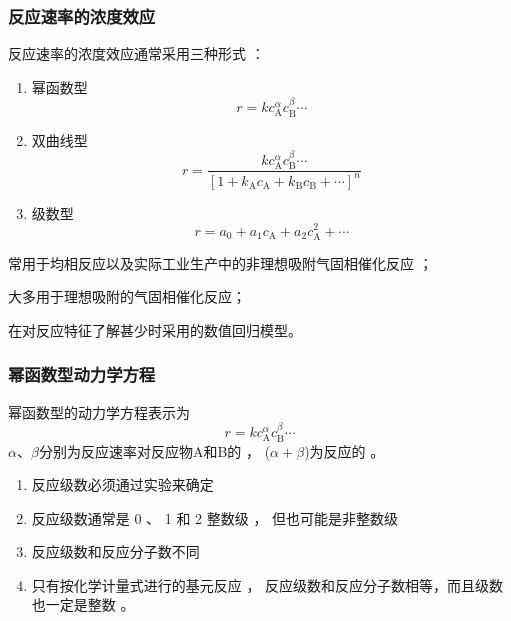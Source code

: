 \begin{frame}
    \frametitle{反应速率的浓度效应}
    \begin{minipage}{0.48\linewidth}
        反应速率的浓度效应通常采用三种形式 ：
        \begin{enumerate}
            \item 幂函数型
              \[
                  r=kc_\mathrm{A}^{\alpha}c_\mathrm{B}^{\beta}\cdots
              \]
            \item 双曲线型
              \[
                  r=\frac{kc_\mathrm{A}^{\alpha}c_\mathrm{B}^{\beta}\cdots}{[1+k_\mathrm{A}c_\mathrm{A}+k_\mathrm{B}c_\mathrm{B}+\cdots]^n}
              \]
            \item 级数型
              \[
                  r=a_0+a_1c_\mathrm{A}+a_2c_\mathrm{A}^2+\cdots
              \]
          \end{enumerate}
    \end{minipage}\hfill
    \begin{minipage}{0.48\linewidth}
        \bigskip

        \bigskip
        常用于均相反应以及实际工业生产中的非理想吸附气固相催化反应 ；
        
        \bigskip

        \bigskip
        大多用于理想吸附的气固相催化反应；
        
        \bigskip

        \bigskip
        在对反应特征了解甚少时采用的数值回归模型。
    \end{minipage}
    
\end{frame}


\begin{frame}
    \frametitle{幂函数型动力学方程}
    幂函数型的动力学方程表示为
    \[
        r=kc_\mathrm{A}^{\alpha}c_\mathrm{B}^{\beta}\cdots
    \]
    $\alpha$、$\beta$分别为反应速率对反应物A和B的 ， ($\alpha+\beta$)为反应的 。

    \begin{enumerate}
      \item 反应级数必须通过实验来确定
      \item 反应级数通常是 0 、 1 和 2 整数级 ， 但也可能是非整数级
      \item 反应级数和反应分子数不同
      \item 只有按化学计量式进行的基元反应 ， 反应级数和反应分子数相等，而且级数也一定是整数 。
    \end{enumerate}
\end{frame}


